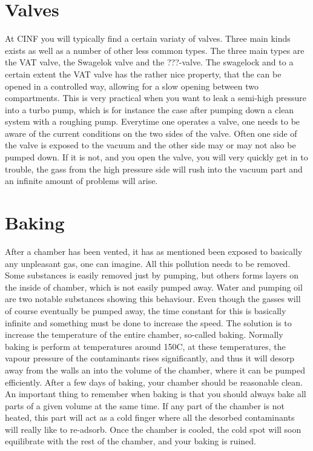 \documentclass[a4paper,english]{article}
\begin{document}
\section{Valves}
At CINF you will typically find a certain variaty of valves. Three main kinds exists as well as a number of other less common types. The three main types are the VAT valve, the Swagelok valve and the ???-valve. The swagelock and to a certain extent the VAT valve has the rather nice property, that the can be opened in a controlled way, allowing for a slow opening between two compartments. This is very practical when you want to leak a semi-high pressure into a turbo pump, which is for instance the case after pumping down a clean system with a roughing pump.
Everytime one operates a valve, one needs to be aware of the current conditions on the two sides of the valve. Often one side of the valve is exposed to the vacuum and the other side may or may not also be pumped down. If it is not, and you open the valve, you will very quickly get in to trouble, the gass from the high pressure side will rush into the vacuum part and an infinite amount of problems will arise.

\section{Baking}
After a chamber has been vented, it has as mentioned been exposed to basically any unpleasant gas, one can imagine. All this pollution needs to be removed. Some substances is easily removed just by pumping, but others forms layers on the inside of chamber, which is not easily pumped away. Water and pumping oil are two notable substances showing this behaviour. Even though the gasses will of course eventually be pumped away, the time constant for this is basically infinite and something must be done to increase the speed. The solution is to increase the temperature of the entire chamber, so-called baking. Normally baking is perform at temperatures around 150C, at these temperatures, the vapour pressure of the contaminants rises significantly, and thus it will desorp away from the walls an into the volume of the chamber, where it can be pumped efficiently. After a few days of baking, your chamber should be reasonable clean.
An important thing to remember when baking is that you should always bake all parts of a given volume at the same time. If any part of the chamber is not heated, this part will act as a cold finger where all the desorbed contaminants will really like to re-adsorb. Once the chamber is cooled, the cold spot will soon equilibrate with the rest of the chamber, and your baking is ruined.

%
%

\end{document}
